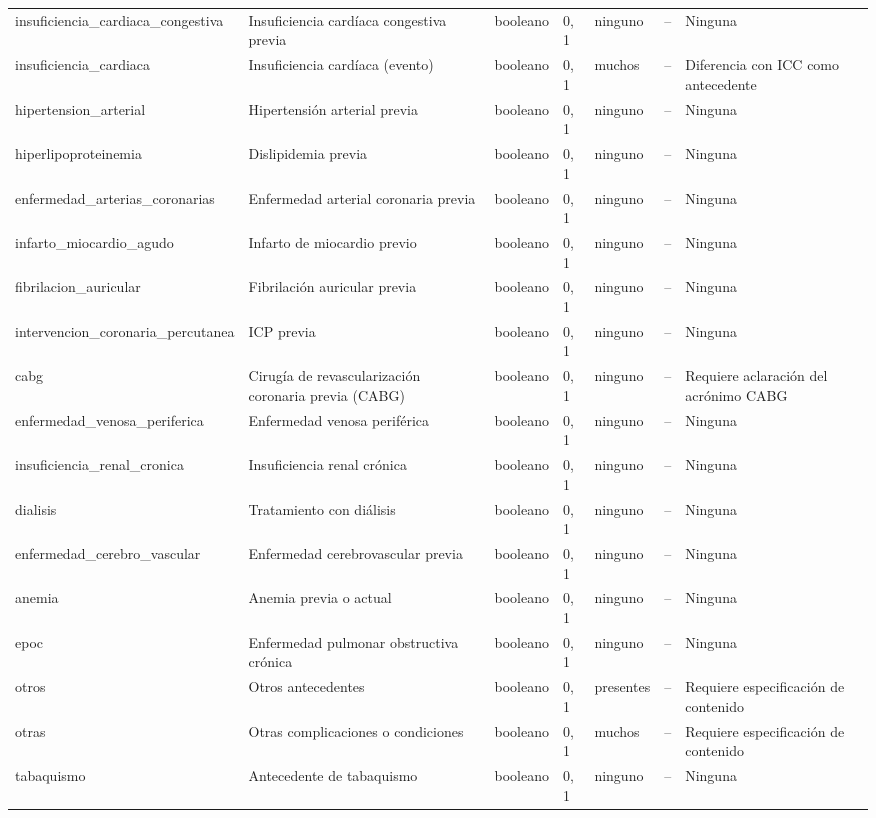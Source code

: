\documentclass[11pt,a4paper]{article}
\begin{document}
\begin{longtable}{@{}L{0.095\textwidth} L{0.17\textwidth} L{0.07\textwidth} L{0.16\textwidth} L{0.14\textwidth} L{0.13\textwidth} L{0.15\textwidth}@{}}
insuficiencia\_cardiaca\_congestiva & Insuficiencia cardíaca congestiva previa & booleano & 0, 1 & ninguno & -- & Ninguna \\
insuficiencia\_cardiaca & Insuficiencia cardíaca (evento) & booleano & 0, 1 & muchos & -- & Diferencia con ICC como antecedente \\
hipertension\_arterial & Hipertensión arterial previa & booleano & 0, 1 & ninguno & -- & Ninguna \\
hiperlipoproteinemia & Dislipidemia previa & booleano & 0, 1 & ninguno & -- & Ninguna \\
enfermedad\_arterias\_coronarias & Enfermedad arterial coronaria previa & booleano & 0, 1 & ninguno & -- & Ninguna \\
infarto\_miocardio\_agudo & Infarto de miocardio previo & booleano & 0, 1 & ninguno & -- & Ninguna \\
fibrilacion\_auricular & Fibrilación auricular previa & booleano & 0, 1 & ninguno & -- & Ninguna \\
intervencion\_coronaria\_percutanea & ICP previa & booleano & 0, 1 & ninguno & -- & Ninguna \\
cabg & Cirugía de revascularización coronaria previa (CABG) & booleano & 0, 1 & ninguno & -- & Requiere aclaración del acrónimo CABG \\
enfermedad\_venosa\_periferica & Enfermedad venosa periférica & booleano & 0, 1 & ninguno & -- & Ninguna \\
insuficiencia\_renal\_cronica & Insuficiencia renal crónica & booleano & 0, 1 & ninguno & -- & Ninguna \\
dialisis & Tratamiento con diálisis & booleano & 0, 1 & ninguno & -- & Ninguna \\
enfermedad\_cerebro\_vascular & Enfermedad cerebrovascular previa & booleano & 0, 1 & ninguno & -- & Ninguna \\
anemia & Anemia previa o actual & booleano & 0, 1 & ninguno & -- & Ninguna \\
epoc & Enfermedad pulmonar obstructiva crónica & booleano & 0, 1 & ninguno & -- & Ninguna \\
otros & Otros antecedentes & booleano & 0, 1 & presentes & -- & Requiere especificación de contenido \\
otras & Otras complicaciones o condiciones & booleano & 0, 1 & muchos & -- & Requiere especificación de contenido \\
tabaquismo & Antecedente de tabaquismo & booleano & 0, 1 & ninguno & -- & Ninguna \\

\end{longtable}
\end{document}
